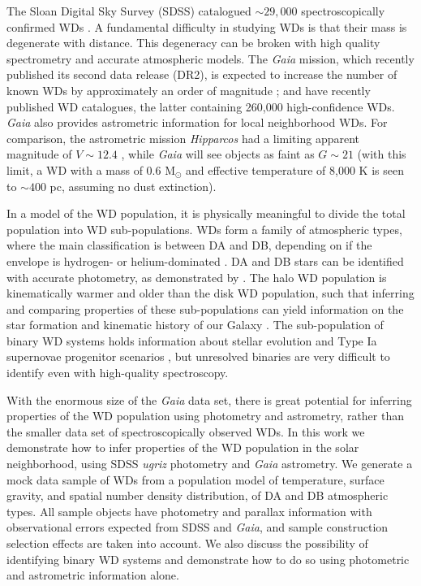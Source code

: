 \documentclass[fleqn,usenatbib]{mnras}
\begin{document}
The Sloan Digital Sky Survey (SDSS) catalogued ${\sim}29,000$ spectroscopically confirmed WDs \citep{2013ApJS..204....5K,2015MNRAS.446.4078K}. A fundamental difficulty in studying WDs is that their mass is degenerate with distance. This degeneracy can be broken with high quality spectrometry and accurate atmospheric models. The \emph{Gaia} mission, which recently published its second data release (DR2), is expected to increase the number of known WDs by approximately an order of magnitude \citep{Jordan:2006jg,2014A&A...565A..11C}; \cite{2018MNRAS.tmp.1537K} and \cite{2018arXiv180703315G} have recently published WD catalogues, the latter containing 260,000 high-confidence WDs. \emph{Gaia} also provides astrometric information for local neighborhood WDs. For comparison, the astrometric mission \emph{Hipparcos} had a limiting apparent magnitude of $V \sim 12.4$ \citep{1997A&A...323L..49P}, while \emph{Gaia} will see objects as faint as $G \sim 21$ (with this limit, a WD with a mass of 0.6 M$_\odot$ and effective temperature of 8,000 K is seen to ${\sim}400$ pc, assuming no dust extinction).

In a model of the WD population, it is physically meaningful to divide the total population into WD sub-populations. WDs form a family of atmospheric types, where the main classification is between DA and DB, depending on if the envelope is hydrogen- or helium-dominated \citep{Tremblay:2007hq,2011ApJ...737...28B,2015A&A...583A..86K}. DA and DB stars can be identified with accurate photometry, as demonstrated by \cite{Mortlock:2008gf}. The halo WD population is kinematically warmer and older than the disk WD population, such that inferring and comparing properties of these sub-populations can yield information on the star formation and kinematic history of our Galaxy \citep{1998ApJ...503..239I,2016MNRAS.463.2453D}. The sub-population of binary WD systems holds information about stellar evolution \citep{Postnov:2014tza} and Type Ia supernovae progenitor scenarios \citep{Livio:2018rue}, but unresolved binaries are very difficult to identify even with high-quality spectroscopy.

With the enormous size of the \emph{Gaia} data set, there is great potential for inferring properties of the WD population using photometry and astrometry, rather than the smaller data set of spectroscopically observed WDs. In this work we demonstrate how to infer properties of the WD population in the solar neighborhood, using SDSS \emph{ugriz} photometry and \emph{Gaia} astrometry. We generate a mock data sample of WDs from a population model of temperature, surface gravity, and spatial number density distribution, of DA and DB atmospheric types. All sample objects have photometry and parallax information with observational errors expected from SDSS and \emph{Gaia}, and sample construction selection effects are taken into account. We also discuss the possibility of identifying binary WD systems and demonstrate how to do so using photometric and astrometric information alone.
\end{document}
